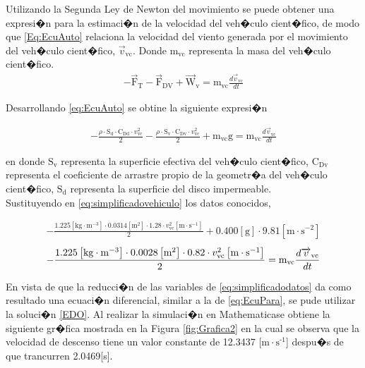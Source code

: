 \documentclass[10pt,a4paper]{book}
\begin{document}
Utilizando la Segunda Ley de Newton del movimiento se puede obtener una expresi�n para la estimaci�n de la velocidad del veh�culo cient�fico, de modo que \eqref{Eq:EcuAuto} relaciona la velocidad del viento generada por el movimiento del veh�culo cient�fico, $\overrightarrow{v}_{\text{vc}}$. Donde $\text{m}_{\text{vc}}$ representa la masa del veh�culo cient�fico.\\
\begin{align}
\label{eq:EcuAuto}
- \overrightarrow{\text{F}}_{\text{T}} -  \overrightarrow{\text{F}}_{\text{DV}}   + \overrightarrow{\text{W}}_{\text{v}}  = \text{m}_{\text{vc}}\frac{d\overrightarrow{v}_{\text{vc}}}{dt}
\end{align} 

Desarrollando \ref{eq:EcuAuto} se obtine la siguiente expresi�n 

\begin{align}
\label{eq:simplificadovehiculo}
-\frac{\rho \cdot \text{S}_{\text{d}} \cdot \text{C}_{\text{Dd}} \cdot v_{\text{vc}}^{2}}{2}-\frac{\rho \cdot \text{S}_{\text{v}} \cdot \text{C}_{\text{Dv}} \cdot v_{\text{vc}}^{2}}{2} + \text{m}_{\text{vc}} \text{g}=  \text{m}_{\text{vc}}\frac{d\overrightarrow{v}_{\text{vc}}}{dt}
\end{align}

en donde $\text{S}_{\text{v}}$ representa la superficie efectiva del veh�culo cient�fico, $\text{C}_{\text{Dv}}$ representa el coeficiente de arrastre propio de la geometr�a del veh�culo cient�fico,  $\text{S}_{\text{d}}$ representa la superficie del disco impermeable.\\
Sustituyendo en \ref{eq:simplificadovehiculo} los datos conocidos, 

\begin{align}
\label{eq:simplificadodatos}
- \frac{1{.}225\left[\text{kg} \cdot \text{m}^{-3} \right] \cdot 0{.}0314 \left[ \text{m}^{2} \right] \cdot 1{.}28 \cdot v_{\text{vc}}^{2} \left[ \text{m} \cdot \text{s}^{-1} \right] }{2} +
0{.}400 \left[ \text{g} \right] \cdot 9{.}81 \left[ \text{m} \cdot \text{s}^{-2} \right]
\end{align}
\begin{align}
\notag
- \frac{1{.}225\left[\text{kg} \cdot \text{m}^{-3} \right] \cdot 0{.}0028 \left[ \text{m}^{2} \right] \cdot 0{.}82 \cdot v_{\text{vc}}^{2} \left[ \text{m} \cdot \text{s}^{-1} \right] }{2} = \text{m}_{\text{vc}}\frac{d\overrightarrow{v}_{\text{vc}}}{dt}
\end{align}

En vista de que la reducci�n de las variables de \eqref{eq:simplificadodatos} da como resultado una ecuaci�n diferencial, similar a la de \eqref{eq:EcuPara}, se pude utilizar la soluci�n \eqref{EDO}. Al realizar la simulaci�n en Mathematica\textregistered  se obtiene la siguiente gr�fica mostrada en la Figura \ref{fig:Grafica2} en la cual se observa que la velocidad de descenso tiene un valor constante de 12.3437 [$\text{m} \cdot \text{s}^{\text{-1}}$] despu�s de que trancurren 2.0469[s].
\end{document}
